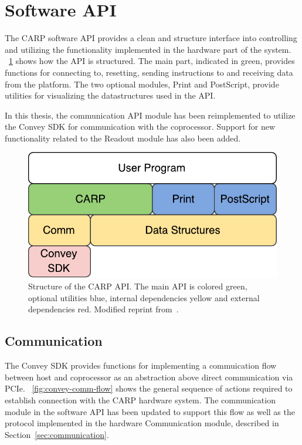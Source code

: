 \renewcommand{\arraystretch}{1}

\section{Software API}

The CARP software API provides a clean and structure interface into controlling
and utilizing the functionality implemented in the hardware part of the system.
\figurename~\ref{fig:sw-api} shows how the API is structured. The main part,
indicated in green, provides functions for connecting to, resetting, sending
instructions to and receiving data from the platform. The two optional modules,
Print and PostScript, provide utilities for visualizing the datastructures used
in the API.

In this thesis, the communication API module has been reimplemented to utilize
the Convey SDK for communication with the coprocessor. Support for new
functionality related to the Readout module has also been added.

\begin{figure}[H]
  \centering
  \includegraphics[width=0.5\linewidth]{fig/sw-api}
  \caption{
    Structure of the CARP API. The main API is colored green, optional utilities
    blue, internal dependencies yellow and external dependencies red. Modified
    reprint from~\cite{Lundal2015a}.
  }
  \label{fig:sw-api}
\end{figure}

\subsection{Communication}

The Convey SDK provides functions for implementing a commuication flow between
host and coprocessor as an abstraction above direct communication via PCIe.
\figurename~\ref{fig:convey-comm-flow} shows the general sequence of actions
required to establish connection with the CARP hardware system. The
communication module in the software API has been updated to support this flow
as well as the protocol implemented in the hardware Communication module, described in
Section~\ref{sec:communication}.

